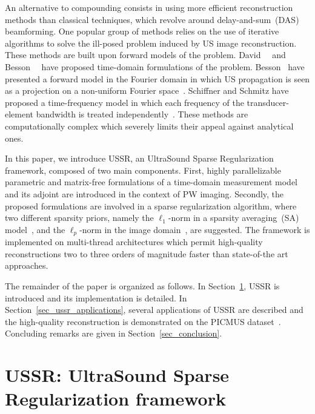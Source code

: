 \documentclass[conference]{IEEEtran}
\begin{document}
An alternative to compounding consists in using more efficient reconstruction methods than classical techniques, which revolve around delay-and-sum~(DAS) beamforming. One popular group of methods relies on the use of iterative algorithms to solve the ill-posed problem induced by US image reconstruction. These methods are built upon forward models of the problem. David~\etal{}~\cite{David_JASA_2015} and Besson~\etal{}~\cite{Besson_ICIP_2016} have proposed time-domain formulations of the problem. Besson~\etal{} have presented a forward model in the Fourier domain in which US propagation is seen as a projection on a non-uniform Fourier space~\cite{Besson_UFFC_2016}. Schiffner and Schmitz have proposed a time-frequency model in which each frequency of the transducer-element bandwidth is treated independently~\cite{Schiffner_IUS_2012}. These methods are computationally complex which severely limits their appeal against analytical ones. 

In this paper, we introduce USSR, an UltraSound Sparse Regularization framework, composed of two main components. First, highly parallelizable parametric and matrix-free formulations of a time-domain measurement model and its adjoint are introduced in the context of PW imaging. Secondly, the proposed formulations are involved in a sparse regularization algorithm, where two different sparsity priors, namely the $\ell_1$-norm in a sparsity averaging~(SA) model~\cite{Besson_UFFC_2016}, and the $\ell_p$-norm in the image domain~\cite{Chen2015}, are suggested. The framework is implemented on multi-thread architectures which permit high-quality reconstructions two to three orders of magnitude faster than state-of-the art approaches.

The remainder of the paper is organized as follows. In Section~\ref{sec_ussr_theory}, USSR is introduced and its implementation is detailed. In Section~\ref{sec_ussr_applications}, several applications of USSR are described and the high-quality reconstruction is demonstrated on the PICMUS dataset~\cite{Liebgott_IUS_2016}. Concluding remarks are given in Section~\ref{sec_conclusion}.
\section{USSR: UltraSound Sparse Regularization framework}
\label{sec_ussr_theory}
\end{document}

